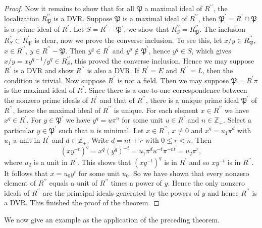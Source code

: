 \begin{proof}
Now it remains to show that for all $\mathfrak{P}$ a maximal ideal of $R^{\prime\prime}$, the localization $R_\mathfrak{P}^{\prime\prime}$ is a DVR. Suppose $\mathfrak{P}$ is a maximal ideal of $R^{\prime\prime}$, then $\mathfrak{P}^\prime=R^\prime\cap\mathfrak{P}$ is a prime ideal of $R^\prime$. Let $S=R^\prime-\mathfrak{P}^\prime$, we show that $R_S^{\prime\prime}=R_\mathfrak{P}^{\prime\prime}$. The inclusion $R_S^{\prime\prime}\subset R_\mathfrak{P}^\prime$ is clear, now we prove the converse inclusion. To see this, let $x/y\in R_\mathfrak{P}^{\prime\prime}$, $x\in R^{\prime\prime}$, $y\in R^{\prime\prime}-\mathfrak{P}$. Then $y^q\in R^\prime$ and $y^q\notin\mathfrak{P}^\prime$, hence $y^q\in S$, which gives $x/y=xy^{q-1}/y^q\in R_S^{\prime\prime}$, this proved the converse inclusion. Hence we may suppose $R^\prime$ is a DVR and show $R^{\prime\prime}$ is also a DVR. If $R^\prime=E$ and $R^{\prime\prime}=L$, then the condition is trivial. Now suppose $R^\prime$ is not a field. Then we may suppose $\mathfrak{P}=R^\prime\pi$ is the maximal ideal of $R^\prime$. Since there is a one-to-one correspondence between the nonzero prime ideals of $R^\prime$ and that of $R^{\prime\prime}$, there is a unique prime ideal $\mathfrak{P}^\prime$ of $R^{\prime\prime}$, hence the maximal ideal of $R^{\prime\prime}$ is unique. For each element $x\in R^{\prime\prime}$ we have $x^q\in R^\prime$. For $y\in\mathfrak{P}^\prime$ we have $y^q=u\pi^n$ for some unit $u\in R^{\prime}$ and $n\in\mathbb{Z}_+$. Select a particular $y\in\mathfrak{P}^\prime$ such that $n$ is minimal. Let $x\in R^{\prime\prime}$, $x\ne 0$ and $x^q=u_1\pi^d$ with $u_1$ a unit in $R^\prime$ and $d\in\mathbb{Z}_+$. Write $d=nt+r$ with $0\le r<n$. Then 
$$
\left( xy^{-t} \right) ^q=x^q\left( y^q \right) ^{-t}=u_1\pi ^du^{-t}\pi ^{-nt}=u_2\pi ^r,
$$
where $u_2$ is a unit in $R^\prime$. This shows that $(xy^{-t})^q$ is in $R^\prime$ and so $xy^{-t}$ is in $R^{\prime\prime}$. It follows that $x=u_0y^t$ for some unit $u_0$. So we have shown that every nonzero element of $R^{\prime\prime}$ equals a unit of $R^{\prime\prime}$ times a power of $y$. Hence the only nonzero ideals of $R^{\prime\prime}$ are the principal ideals generated by the powers of $y$ and hence $R^{\prime\prime}$ is a DVR. This finished the proof of the theorem.
\end{proof}
We now give an example as the application of the preceding theorem.
